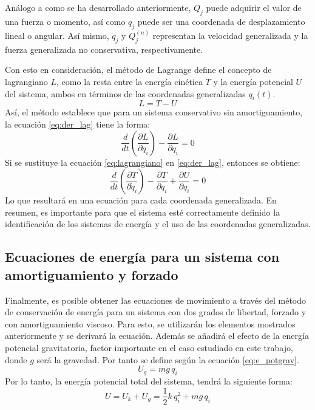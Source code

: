 Análogo a como se ha desarrollado anteriormente, $Q_j$ puede adquirir el valor de una fuerza o momento, así como $q_j$ puede ser una coordenada de desplazamiento lineal o angular. Así mismo, $\dot{q}_j$ y $Q_j^{(n)}$ representan la velocidad generalizada y la fuerza generalizada no conservativa, respectivamente.

Con esto en consideración, el método de Lagrange define el concepto de lagrangiano $L$, como la resta entre la energía cinética $T$ y la energía potencial $U$ del sistema, ambos en términos de las coordenadas generalizadas $q_i(t)$.
\begin{equation}\label{eq:lagrangiano}
	L = T - U
\end{equation} 
Así, el método establece que para un sistema conservativo sin amortiguamiento, la ecuación \ref{eq:der_lag} tiene la forma:
\begin{equation}\label{eq:der_lag}
	\frac{d}{dt}\left(\frac{\partial L}{\partial \dot{q}_i}\right) - \frac{\partial L}{\partial q_i} = 0
\end{equation}
Si se sustituye la ecuación \ref{eq:lagrangiano} en \ref{eq:der_lag}, entonces se obtiene:
\begin{equation}\label{eq:der_lagconsv}
	\frac{d}{dt}\left(\frac{\partial T}{\partial \dot{q}_i}\right) - \frac{\partial T}{\partial q_i} + \frac{\partial U}{\partial q_i} = 0
\end{equation}
Lo que resultará en una ecuación para cada coordenada generalizada. En resumen, es importante para que el sistema esté correctamente definido la identificación de los sistemas de energía y el uso de las coordenadas generalizadas. 


\subsection{Ecuaciones de energía para un sistema con amortiguamiento y forzado}
Finalmente, es posible obtener las ecuaciones de movimiento a través del método de conservación de energía para un sistema con dos grados de libertad, forzado y con amortiguamiento viscoso. Para esto, se utilizarán los elementos mostrados anteriormente y se derivará la ecuación. Además se añadirá el efecto de la energía potencial gravitatoria, factor importante en el caso estudiado en este trabajo, donde $g$ será la gravedad. Por tanto se define según la ecuación \ref{eq:e_potgrav}. 
\begin{equation}\label{eq:e_potgrav}
	U_g = mg\,q_i
\end{equation}
Por lo tanto, la energía potencial total del sistema, tendrá la siguiente forma:
\begin{equation}\label{eq:e_potencial}
	U = U_k + U_g = \frac{1}{2}k\,q_i^2 + mg\,q_i
\end{equation}

